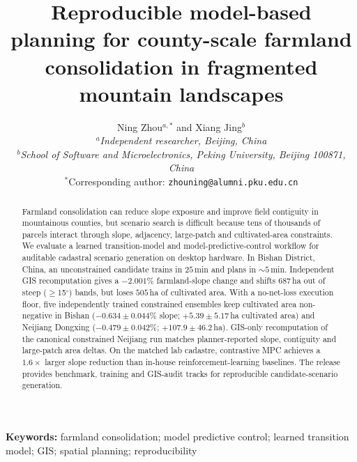 \documentclass[11pt]{article}
\begin{document}
\title{Reproducible model-based planning for county-scale farmland consolidation in fragmented mountain landscapes}

\author{Ning Zhou$^{a,\ast}$ and Xiang Jing$^{b}$\\
$^{a}${\em Independent researcher, Beijing, China}\\
$^{b}${\em School of Software and Microelectronics, Peking University, Beijing 100871, China}\\
$^\ast$Corresponding author: \texttt{zhouning@alumni.pku.edu.cn}}

\date{}
\maketitle
\sloppy  %
\linenumbers

\begin{abstract}
Farmland consolidation can reduce slope exposure and improve field contiguity in mountainous counties, but scenario search is difficult because tens of thousands of parcels interact through slope, adjacency, large-patch and cultivated-area constraints. We evaluate a learned transition-model and model-predictive-control workflow for auditable cadastral scenario generation on desktop hardware. In Bishan District, China, an unconstrained candidate trains in $25$\,min and plans in ${\sim}5$\,min. Independent GIS recomputation gives a $-2.001\%$ farmland-slope change and shifts $687$\,ha out of steep ($\geq$15$^\circ$) bands, but loses $505$\,ha of cultivated area. With a no-net-loss execution floor, five independently trained constrained ensembles keep cultivated area non-negative in Bishan ($-0.634 \pm 0.044\%$ slope; $+5.39 \pm 5.17$\,ha cultivated area) and Neijiang Dongxing ($-0.479 \pm 0.042\%$; $+107.9 \pm 46.2$\,ha). GIS-only recomputation of the canonical constrained Neijiang run matches planner-reported slope, contiguity and large-patch area deltas. On the matched lab cadastre, contrastive MPC achieves a $1.6\times$ larger slope reduction than in-house reinforcement-learning baselines. The release provides benchmark, training and GIS-audit tracks for reproducible candidate-scenario generation.
\end{abstract}

\noindent\textbf{Keywords:} farmland consolidation; model predictive control; learned transition model; GIS; spatial planning; reproducibility
\end{document}
